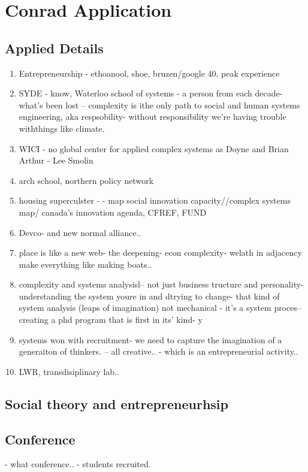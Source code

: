 \chapter{Conrad Application}

\begin{comment}

TODO 
- LinkedIn
- ReseachGate/ORCID
-

- copy xx's lab

JOB DESCRIPTION
https://uwaterloo.ca/engineering/associate-or-full-professor-organizational-behaviour?utm_source=dept&utm_medium=dept&utm_id=dept

\end{comment}


\section{Applied Details}

\begin{enumerate}
    \item Entrepreneurship - ethoanool, shoe, bruzen/google 40, peak experience 
    \item SYDE - know, Waterloo school of systems - a person from each decade- what's been lost -- complexity is ithe only path to social and human systems engineering, aka respsobility- without responsibility we're having trouble withthings like climate.
    \item WICI - no global center for applied complex systems as Doyne and Brian Arthur - Lee Smolin
    \item arch school, northern policy network
    \item housing superculster -  - map social innovation capacity//complex systems map/ canada's innovation agenda, CFREF, FUND
    \item Devco- and new normal alliance.. 
    \item place is like a new web- the deepening- econ complexity- welath in adjacency  make everything like making boats..
    \item complexity and systems analysisl-- not just business tructure and personality- understanding the system youre in and dtrying to change- that kind of system analysis (leaps of imagination) not mechanical - it's a system proces-- creating a phd program that is first in its' kind- y
    \item systems won with recruitment- we need to capture the imagination of a generaiton of thinkers. -- all creative.. - which is an entrepreneurial activity.. \item LWR, transdisiplinary lab..
\end{enumerate}

\section{Social theory and entrepreneurhsip}




\section{Conference}

- what conference..
- students recruited.




